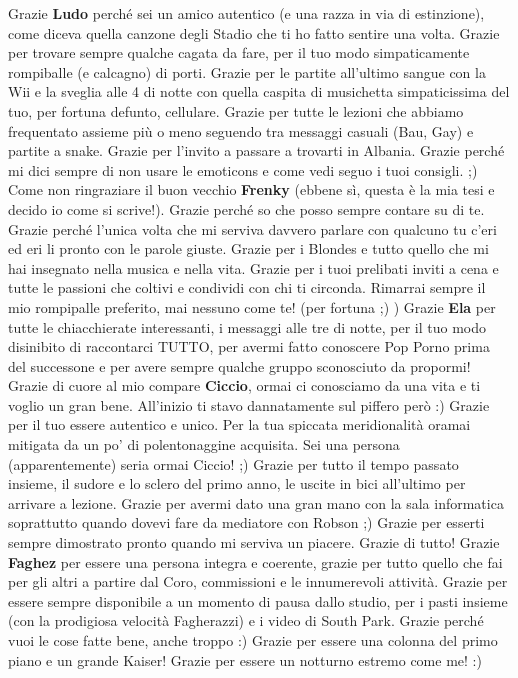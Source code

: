 \documentclass[10pt]{amsart}
\newcommand{\n}[1]{{\Large \bf #1}}
\begin{document}
Grazie \n{Ludo} perché sei un amico autentico (e una razza in via di estinzione), come diceva quella canzone degli Stadio che ti ho fatto sentire una volta. Grazie per trovare sempre qualche cagata da fare, per il tuo modo simpaticamente rompiballe (e calcagno) di porti. Grazie per le partite all'ultimo sangue con la Wii e la sveglia alle 4 di notte con quella caspita di musichetta simpaticissima del tuo, per fortuna defunto, cellulare. Grazie per tutte le lezioni che abbiamo frequentato assieme più o meno seguendo tra messaggi casuali (Bau, Gay) e partite a snake. Grazie per l'invito a passare a trovarti in Albania. Grazie perché mi dici sempre di non usare le emoticons e come vedi seguo i tuoi consigli. ;)
Come non ringraziare il buon vecchio \n{Frenky} (ebbene sì, questa è la mia tesi e decido io come si scrive!). Grazie perché so che posso sempre contare su di te. Grazie perché l'unica volta che mi serviva davvero parlare con qualcuno tu c'eri ed eri li pronto con le parole giuste. Grazie per i Blondes e tutto quello che mi hai insegnato nella musica e nella vita. Grazie per i tuoi prelibati inviti a cena e tutte le passioni che coltivi e condividi con chi ti circonda. Rimarrai sempre il mio rompipalle preferito, mai nessuno come te! (per fortuna ;) )  Grazie \n{Ela} per tutte le chiacchierate interessanti, i messaggi alle tre di notte, per il tuo modo disinibito di raccontarci TUTTO, per avermi fatto conoscere Pop Porno prima del successone e per avere sempre qualche gruppo sconosciuto da propormi!
Grazie di cuore al mio compare \n{Ciccio}, ormai ci conosciamo da una vita e ti voglio un gran bene. All'inizio ti stavo dannatamente sul piffero però :) Grazie per il tuo essere autentico e unico. Per la tua spiccata meridionalità oramai mitigata da un po' di polentonaggine acquisita. Sei una persona (apparentemente) seria ormai Ciccio! ;) Grazie per tutto il tempo passato insieme, il sudore e lo sclero del primo anno, le uscite in bici all'ultimo per arrivare a lezione. Grazie per avermi dato una gran mano con la sala informatica soprattutto quando dovevi fare da mediatore con Robson ;) Grazie per esserti sempre dimostrato pronto quando mi serviva un piacere. Grazie di tutto!
Grazie \n{Faghez} per essere una persona integra e coerente, grazie per tutto quello che fai per gli altri a partire dal Coro, commissioni e le innumerevoli attività. Grazie per essere sempre disponibile a un momento di pausa dallo studio, per i pasti insieme (con la prodigiosa velocità Fagherazzi) e i video di South Park. Grazie perché vuoi le cose fatte bene, anche troppo :) Grazie per essere una colonna del primo piano e un grande Kaiser! Grazie per essere un notturno estremo come me! :)
\end{document}
